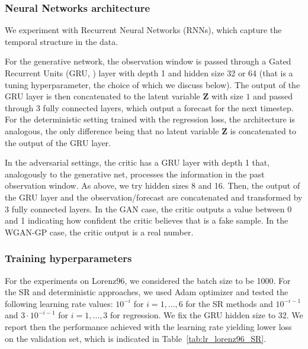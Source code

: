 \documentclass[twoside,11pt]{article}
\begin{document}
	
	\subsubsection{Neural Networks architecture}\label{app:Lorenz_nets}
	
	
	We experiment with Recurrent Neural Networks (RNNs), which capture the temporal structure in the data.
	
	
	
	For the generative network, the observation window is passed through a Gated Recurrent Units (GRU, \citealp{cho2014properties}) layer with depth 1 and hidden size 32 or 64 (that is a tuning hyperparameter, the choice of which we discuss below). The output of the GRU layer is then concatenated to the latent variable $ \mathbf{Z} $ with size $ 1 $ and passed through 3 fully connected layers, which output a forecast for the next timestep. For the deterministic setting trained with the regression loss, the architecture is analogous, the only difference being that no latent variable $ \mathbf Z $ is concatenated to the output of the GRU layer.
	
	In the adversarial settings, the critic has a GRU layer with depth 1 that, analogously to the generative net, processes the information in the past observation window. As above, we try hidden sizes 8 and 16. Then, the output of the GRU layer and the observation/forecast are concatenated and transformed by 3 fully connected layers. In the GAN case, the critic outputs a value between 0 and 1 indicating how confident the critic believes that is a fake sample. In the WGAN-GP case, the critic output is a real number.
	
	
	
	
	
	
	
	\subsubsection{Training hyperparameters}\label{app:Lorenz_hyperparameters}
	
	For the experiments on Lorenz96, we considered the batch size to be 1000. For the SR and deterministic approaches, we used Adam optimizer and tested the following learning rate values: $ 10^{-i} $ for $ i=1,\ldots, 6 $ for the SR methods and $ 10^{-i-1} $ and $ 3\cdot 10^{-i - 1} $ for $ i=1,\ldots, 3 $ for regression. We fix the GRU hidden size to 32. We report then the performance achieved with the learning rate yielding lower loss on the validation set, which is indicated in Table~\ref{tab:lr_lorenz96_SR}.
	
\end{document}
